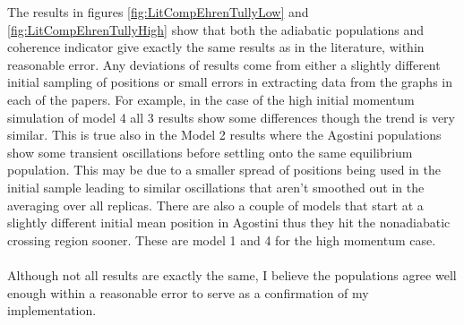 The results in figures \ref{fig:LitCompEhrenTullyLow} and \ref{fig:LitCompEhrenTullyHigh} show that both the adiabatic populations and coherence indicator give exactly the same results as in the literature, within reasonable error. Any deviations of results come from either a slightly different initial sampling of positions or small errors in extracting data from the graphs in each of the papers. For example, in the case of the high initial momentum simulation of model 4 all 3 results show some differences though the trend is very similar. This is true also in the Model 2 results where the Agostini populations show some transient oscillations before settling onto the same equilibrium population. This may be due to a smaller spread of positions being used in the initial sample leading to similar oscillations that aren't smoothed out in the averaging over all replicas. There are also a couple of models that start at a slightly different initial mean position in Agostini \cite{agostini_quantum-classical_2016} thus they hit the nonadiabatic crossing region sooner. These are model 1 and 4 for the high momentum case.
\\\\
Although not all results are exactly the same, I believe the populations agree well enough within a reasonable error to serve as a confirmation of my implementation.
